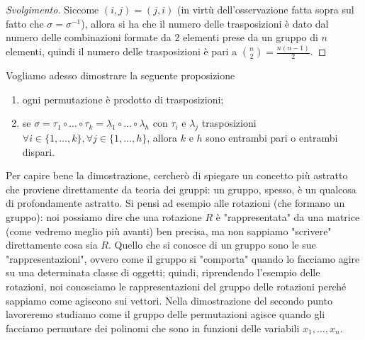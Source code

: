 \begin{proof}[Svolgimento]
    Siccome $(i, j) = (j, i)$ (in virtù dell'osservazione fatta sopra sul fatto che $\sigma=\sigma^{-1}$), allora si ha che il numero delle trasposizioni è dato dal numero delle combinazioni formate da $2$ elementi prese da un gruppo di $n$ elementi, quindi il numero delle trasposizioni è pari a $\binom{n}{2} = \frac{n(n-1)}{2}.$
\end{proof}
Vogliamo adesso dimostrare la seguente proposizione
\begin{prop} \hspace{1cm}
    \begin{enumerate}[label=\protect\circled{\arabic*}]
        \item ogni permutazione è prodotto di trasposizioni;
        \item se $\sigma = \tau_1 \circ \ldots \circ \tau_k = \lambda_1 \circ \ldots \circ \lambda_h$ con $\tau_i$ e $\lambda_j$ trasposizioni $\forall i \in \{1, \ldots, k \}, \forall j \in \{1,\ldots, h \}$, allora $k$ e $h$ sono entrambi pari o entrambi dispari. 
    \end{enumerate}
\end{prop}
Per capire bene la dimostrazione, cercherò di spiegare un concetto più astratto che proviene direttamente da teoria dei gruppi: un gruppo, spesso, è un qualcosa di profondamente astratto. Si pensi ad esempio alle rotazioni (che formano un gruppo): noi possiamo dire che una rotazione $R$ è "rappresentata" da una matrice (come vedremo meglio più avanti) ben precisa, ma non sappiamo "scrivere" direttamente cosa sia $R$. Quello che
si conosce di un gruppo sono le sue "rappresentazioni", ovvero come il gruppo si "comporta" quando lo facciamo agire su una determinata classe di oggetti; quindi, riprendendo l'esempio delle rotazioni, noi conosciamo le rappresentazioni del gruppo delle rotazioni perché sappiamo come agiscono sui vettori. Nella dimostrazione del secondo punto lavoreremo studiamo come il gruppo delle permutazioni agisce quando gli facciamo permutare dei polinomi che sono in funzioni delle variabili $x_1, \ldots, x_n$. 
